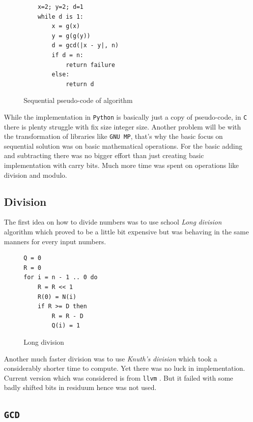 \documentclass[a4paper]{article}
\begin{document}
\begin{figure}[H]
    \centering
    \begin{lstlisting}
    x=2; y=2; d=1
    while d is 1:
        x = g(x)
        y = g(g(y))
        d = gcd(|x - y|, n)
        if d = n: 
            return failure
        else:
            return d
    \end{lstlisting}
    \caption{Sequential pseudo-code of algorithm}
    \label{singl_alg}
\end{figure}

While the implementation in \texttt{Python} is basically just a copy of pseudo-code, in \texttt{C} there is plenty struggle with fix size integer size. Another problem will be with the transformation of libraries like \texttt{GNU MP}, that's why the basic focus on sequential solution was on basic mathematical operations. For the basic adding and subtracting there was no bigger effort than just creating basic implementation with carry bits. Much more time was spent on operations like division and modulo.

\subsection{Division}

The first idea on how to divide numbers was to use school \emph{Long division} algorithm which proved to be a little bit expensive but was behaving in the same manners for every input numbers.

\begin{figure}[H]
    \centering
    \begin{lstlisting}
Q = 0
R = 0                     
for i = n - 1 .. 0 do
    R = R << 1
    R(0) = N(i)
    if R >= D then
        R = R - D
        Q(i) = 1
    \end{lstlisting}
    \caption{Long division \cite{long_div}}
    \label{long_div}
\end{figure}

Another much faster division was to use \emph{Knuth's division} \cite{knuth} which took a considerably shorter time to compute. Yet there was no luck in implementation. Current version which was considered is from \texttt{llvm} \cite{llvm}. But it failed with some badly shifted bits in residuum hence was not used.

\subsection{\texttt{GCD}}
\end{document}
